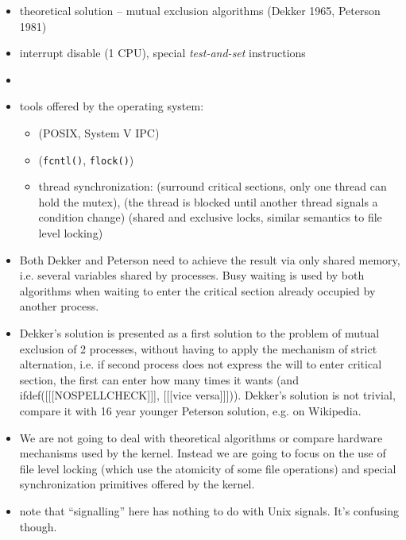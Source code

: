 \begin{slide}
\begin{itemize}
\item theoretical solution -- mutual exclusion algorithms (Dekker
1965, Peterson 1981)
\item interrupt disable (1 CPU), special \emph{test-and-set} instructions
\item {}
\item tools offered by the operating system:
    \begin{itemize}
    \item {} (POSIX, System V IPC)
    \item {} (\texttt{fcntl()}, \texttt{flock()})
    \item thread synchronization:  (surround critical sections,
    only one thread can hold the mutex), 
    (the thread is blocked until another thread signals a condition change)
     (shared and exclusive locks, similar semantics
    to file level locking)
    \end{itemize}
\end{itemize}
\end{slide}

\begin{itemize}
\item Both Dekker and Peterson need to achieve the result via only shared
memory, i.e. several variables shared by processes.  Busy waiting is used by
both algorithms when waiting to enter the critical section already occupied by
another process.
\item Dekker's solution is presented as a first solution to the problem of
mutual exclusion of 2 processes, without having to apply the mechanism of
strict alternation, i.e. if second process does not express the will to enter
critical section, the first can enter how many times it wants
(and ifdef([[[NOSPELLCHECK]]], [[[vice versa]]])).
Dekker's solution is not trivial, compare it with 16 year younger
Peterson solution, e.g. on Wikipedia.
\item We are not going to deal with theoretical algorithms or compare hardware
mechanisms used by the kernel. Instead we are going to focus on the use of
file level locking (which use the atomicity of some file operations)
and special synchronization primitives offered by the kernel.
\item note that ``signalling'' here has nothing to do with Unix signals.  It's
confusing though.
\end{itemize}

